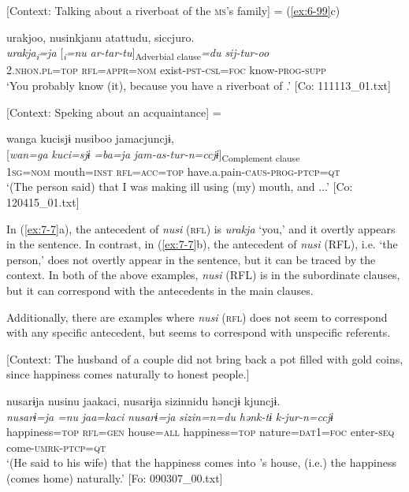 \ea \label{ex:7:7}  
\ea\label{ex:7:7a}  [Context: Talking about a riverboat of the \textsc{ms}’s family] = (\ref{ex:6-99}c)

  {\TM}
\glll urakjoo,  nusinkjanu  atattudu,   siccjuro.\\
\textit{urakja\textsubscript{i}}\textit{=ja}  [\textit{\textsubscript{i}}\textit{=nu}  \textit{ar-tar-tu}]\textsubscript{Adverbial clause}\textit{=du}  \textit{sij-tur-oo}\\
      2.\textsc{nhon}.\textsc{pl}=\textsc{top}  \textsc{rfl}=\textsc{appr}=\textsc{nom}  exist-\textsc{pst}-\textsc{csl}=\textsc{foc}   know-\textsc{prog}-\textsc{supp}\\
\glt    ‘You probably know (it), because you have a riverboat of .’      [Co: 111113\_01.txt]

\ex\label{ex:7:7b}  [Context: Speking about an acquaintance] = 

{\TM}
\glll  wanga  kucisjɨ  nusiboo  jamacjuncjɨ,\\
{}[\textit{wan=ga}  \textit{kuci=sjɨ}  \textit{=ba=ja}  \textit{jam-as-tur-n=ccjɨ}]\textsubscript{Complement clause}\\
1\textsc{sg}=\textsc{nom}  mouth=\textsc{inst}  \textsc{rfl}=\textsc{acc}=\textsc{top}  have.a.pain-\textsc{caus}-\textsc{prog}-\textsc{ptcp}=\textsc{qt}\\
\glt ‘(The person said) that I was making \textit{\textsubscript{} }ill using (my) mouth, and ...’ [Co: 120415\_01.txt]

\z
\z

In (\ref{ex:7-7}a), the antecedent of \textit{nusi} (\textsc{rfl}) is \textit{urakja} ‘you,’ and it overtly appears in the sentence. In contrast, in (\ref{ex:7-7}b), the antecedent of \textit{nusi} (RFL), i.e. ‘the person,’ does not overtly appear in the sentence, but it can be traced by the context. In both of the above examples, \textit{nusi} (RFL) is in the subordinate clauses, but it can correspond with the antecedents in the main clauses.

  Additionally, there are examples where \textit{nusi} (\textsc{rfl}) does not seem to correspond with any specific antecedent, but seems to correspond with unspecific referents.

\ea \label{ex:7:8}  [Context: The husband of a couple did not bring back a pot filled with gold coins, since happiness comes naturally to honest people.]

{\TM}
\glll nusarɨja  nusinu  jaakaci,  nusarɨja  sizinnidu   həncjɨ  kjuncjɨ.\\
\textit{nusarɨ=ja}  \textit{=nu}  \textit{jaa=kaci}  \textit{nusarɨ=ja}  \textit{sizin=n=du} \textit{hənk-tɨ}  \textit{k-jur-n=ccjɨ}\\
    happiness=\textsc{top}  \textsc{rfl}=\textsc{gen}  house=\textsc{all}  happiness=\textsc{top}  nature=\textsc{dat}1=\textsc{foc}  enter-\textsc{seq}  come-\textsc{umrk}-\textsc{ptcp}=\textsc{qt}\\
\glt    ‘(He said to his wife) that the happiness comes into ’s house, (i.e.) the happiness (comes home) naturally.’ [Fo: 090307\_00.txt]

